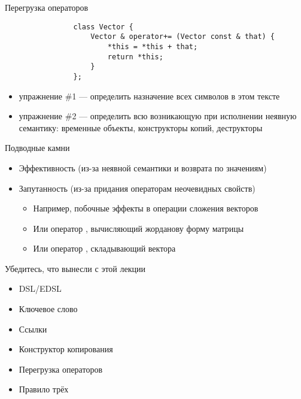 \documentclass[aspectratio=169,14pt]{beamer}
\begin{document}
    \begin{frame}[fragile]{Перегрузка операторов}
            \begin{verbatim}
                class Vector {
                    Vector & operator+= (Vector const & that) {
                        *this = *this + that;
                        return *this;
                    }
                };
            \end{verbatim}
            \vfill
            \footnotesize
            \begin{itemize}
                \item упражнение \#1 --- определить назначение всех символов в этом тексте
                \item упражнение \#2 --- определить всю возникающую при исполнении неявную семантику: временные объекты, конструкторы копий, деструкторы
            \end{itemize}
    \end{frame}

    \begin{frame}[fragile]{Подводные камни}
        \begin{itemize}
            \item Эффективность (из-за неявной семантики и возврата по значениям)
            \item Запутанность (из-за придания операторам неочевидных свойств)
                \begin{itemize}
                    \item Например, побочные эффекты в операции сложения векторов
                    \item Или оператор \code{!}, вычисляющий жорданову форму матрицы
                    \item Или оператор \code{-}, складывающий вектора
                \end{itemize}
        \end{itemize}
    \end{frame}

    \begin{frame}[fragile]{Убедитесь, что вынесли с этой лекции}
        \begin{itemize}
            \item DSL/EDSL
            \item Ключевое слово 
            \item Ссылки
            \item Конструктор копирования
            \item Перегрузка операторов
            \item Правило трёх
        \end{itemize}
    \end{frame}
\end{document}
